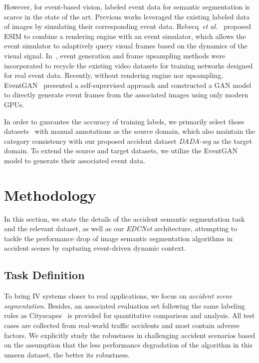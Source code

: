 \documentclass[journal]{IEEEtran}
\begin{document}
However, for event-based vision, labeled event data for semantic segmentation is scarce in the state of the art. Previous works leveraged the existing labeled data of images by simulating their corresponding event data. Rebecq~\textit{et al.}~\cite{rebecq2018esim} proposed ESIM to combine a rendering engine with an event simulator, which allows the event simulator to adaptively query visual frames based on the dynamics of the visual signal. In~\cite{gehrig2020video2event}, event generation and frame upsampling methods were incorporated to recycle the existing video datasets for training networks designed for real event data. Recently, without rendering engine nor upsampling, EventGAN~\cite{zhu2019eventgan} presented a self-supervised approach and constructed a GAN model to directly generate event frames from the associated images using only modern GPUs. 

In order to guarantee the accuracy of training labels, we primarily select those datasets~\cite{cordts2016cityscapes}\cite{xie2016semantic}\cite{yu2020bdd100k}\cite{wang2019apolloscape} with manual annotations as the source domain, which also maintain the category consistency with our proposed accident dataset \emph{DADA-seg} as the target domain. To extend the source and target datasets, we utilize the EventGAN model to generate their associated event data.


\section{Methodology}
In this section, we state the details of the accident semantic segmentation task and the relevant dataset, as well as our \emph{EDCNet} architecture, attempting to tackle the performance drop of image semantic segmentation algorithms in accident scenes by capturing event-driven dynamic context.

\subsection{Task Definition}\label{method:task_definition}
To bring IV systems closer to real applications, we focus on \emph{accident scene segmentation}. Besides, an associated evaluation set following the same labeling rules as Cityscapes~\cite{cordts2016cityscapes} is provided for quantitative comparison and analysis. All test cases are collected from real-world traffic accidents and most contain adverse factors. We explicitly study the robustness in challenging accident scenarios based on the assumption that the less performance degradation of the algorithm in this unseen dataset, the better its robustness. 
\end{document}

